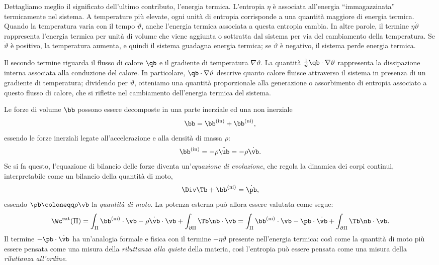 Dettagliamo meglio il significato dell'ultimo contributo, l'energia termica. L'entropia $\eta$ è associata all'energia ``immagazzinata'' termicamente nel sistema. A temperature più elevate, ogni unità di entropia corrisponde a una quantità maggiore di energia termica. Quando la temperatura varia con il tempo $\dot{\vartheta}$, anche l'energia termica associata a questa entropia cambia. In altre parole, il termine $\eta\dot{\vartheta}$ rappresenta l'energia termica per unità di volume che viene aggiunta o sottratta dal sistema per via del cambiamento della temperatura. Se $\dot{\vartheta}$ è positivo, la temperatura aumenta, e quindi il sistema guadagna energia termica; se $\dot{\vartheta}$ è negativo, il sistema perde energia termica.

Il secondo termine  riguarda il flusso di calore $\qb$ e il gradiente di temperatura $\nabla\vartheta$. La quantità $\frac{1}{\vartheta}\qb \cdot \nabla\vartheta$ rappresenta la dissipazione interna associata alla conduzione del calore. In particolare, $\qb \cdot \nabla\vartheta$ descrive quanto calore fluisce attraverso il sistema in presenza di un gradiente di temperatura; dividendo per $\vartheta$, otteniamo una quantità proporzionale alla generazione o assorbimento di entropia associato a questo flusso di calore, che si riflette nel cambiamento dell'energia termica del sistema.


\begin{remark}\label{bb}
Le forze di volume $\bb$ possono essere decomposte in una parte inerziale ed una non inerziale 
\begin{equation}
\bb =\bb^{({\rm in})}+\bb^{({\rm ni})},
\end{equation}
essendo le forze inerziali legate all'accelerazione e alla densità di massa $\rho$:
\begin{equation}
\bb^{({\rm in})}=-\rho \ddot{\ub}=-\rho \dot{\vb}.
\end{equation}
Se si fa questo, l'equazione di bilancio delle forze diventa un'\textit{equazione di evoluzione}, che regola la dinamica dei corpi continui, interpretabile come un bilancio della quantità di moto,
\begin{equation}
\Div \Tb+\bb^{({\rm ni})}=\dot{\pb},
\end{equation}
essendo $\pb\coloneqq\rho \vb$ la \textit{quantità di moto}. La potenza esterna può allora essere valutata come segue:
\begin{equation}
	\Wc^{\rm ext}(\Pi)= \int_{\Pi} \bb^{({\rm ni})} \cdot \vb-\rho \dot{\vb} \cdot \vb + \int_{\partial \Pi} \Tb\nb\cdot \vb=\int_{\Pi} \bb^{({\rm ni})} \cdot \vb-\pb \cdot \dot{\vb} + \int_{\partial \Pi} \Tb\nb\cdot \vb.
\end{equation}
Il termine $-\pb \cdot \dot{\vb}$ ha un'analogia formale e fisica con il termine $-\eta \dot{\vartheta}$ presente nell'energia termica: così come la quantità di moto più essere pensata come una misura della \textit{riluttanza alla quiete} della materia, così l'entropia può essere pensata come una misura della \textit{riluttanza all'ordine}.
\end{remark}

	
	